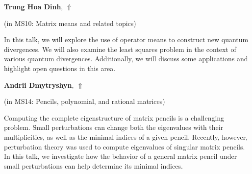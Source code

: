 \documentclass[ILAS2025-program.tex]{subfiles}
\begin{document}
\hypertarget{down0254}{}\begin{ilasabstract}
    
\textbf{Trung Hoa Dinh},  \hfill \hyperlink{up0254}{$\Uparrow$}
    
    
(in {\color{mstitle}MS10: Matrix means and related topics})
        
\mtskip
    In this talk, we will explore the use of operator means to construct new quantum divergences. We will also examine the least squares problem in the context of various quantum divergences. Additionally, we will discuss some applications and highlight open questions in this area.

\end{ilasabstract}
    

\hypertarget{down0216}{}\begin{ilasabstract}
    
\textbf{Andrii Dmytryshyn},  \hfill \hyperlink{up0216}{$\Uparrow$}
    
    
(in {\color{mstitle}MS14: Pencils, polynomial, and rational matrices})
        
\mtskip
    Computing the complete eigenstructure of matrix pencils is a challenging problem. Small perturbations can change both the eigenvalues with their multiplicities, as well as the minimal indices of a given pencil. Recently, however, perturbation theory was used to compute eigenvalues of singular matrix pencils. In this talk, we investigate how the behavior of a general matrix pencil under small perturbations can help determine its minimal indices.

\end{ilasabstract}
    
\end{document}
